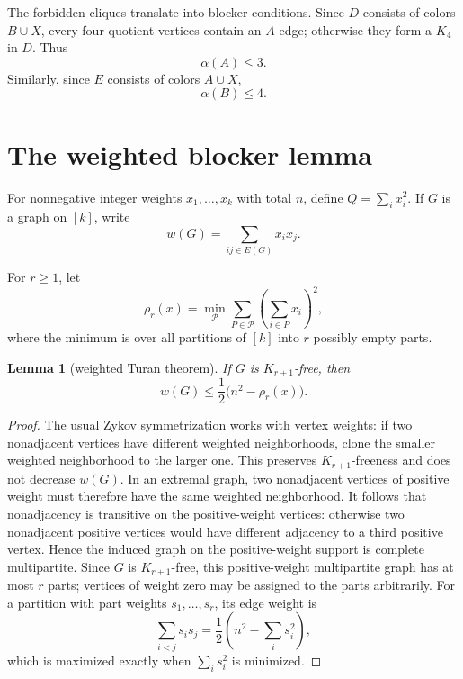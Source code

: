 \documentclass[12pt]{article}
\theoremstyle{plain}
\newtheorem{lemma}[theorem]{Lemma}
\theoremstyle{definition}
\theoremstyle{remark}
\begin{document}
The forbidden cliques translate into blocker conditions.  Since
\(D\) consists of colors \(B\cup X\), every four quotient vertices contain an
\(A\)-edge; otherwise they form a \(K_4\) in \(D\).  Thus
\begin{equation}\label{eq:alphaA}
  \alpha(A)\le3.
\end{equation}
Similarly, since \(E\) consists of colors \(A\cup X\),
\begin{equation}\label{eq:alphaB}
  \alpha(B)\le4.
\end{equation}

\section{The weighted blocker lemma}\label{sec:blocker}

For nonnegative integer weights \(x_1,\ldots,x_k\) with total \(n\), define
\(Q=\sum_i x_i^2\).  If \(G\) is a graph on \([k]\), write
\[
  w(G)=\sum_{ij\in E(G)}x_i x_j.
\]

For \(r\ge1\), let
\[
  \rho_r(x)=\min_{\mathcal P}\sum_{P\in\mathcal P}
  \left(\sum_{i\in P}x_i\right)^2,
\]
where the minimum is over all partitions of \([k]\) into \(r\) possibly empty
parts.

\begin{lemma}[weighted Turan theorem]\label{lem:weighted-turan}
If \(G\) is \(K_{r+1}\)-free, then
\begin{equation}\label{eq:weighted-turan}
  w(G)\le\frac12\bigl(n^2-\rho_r(x)\bigr).
\end{equation}
\end{lemma}

\begin{proof}
The usual Zykov symmetrization works with vertex weights: if two nonadjacent
vertices have different weighted neighborhoods, clone the smaller weighted
neighborhood to the larger one.  This preserves \(K_{r+1}\)-freeness and does
not decrease \(w(G)\).  In an extremal graph, two nonadjacent vertices of
positive weight must therefore have the same weighted neighborhood.  It follows
that nonadjacency is transitive on the positive-weight vertices: otherwise two
nonadjacent positive vertices would have different adjacency to a third
positive vertex.  Hence the induced graph on the positive-weight support is
complete multipartite.  Since \(G\) is \(K_{r+1}\)-free, this positive-weight
multipartite graph has at most \(r\) parts; vertices of weight zero may be
assigned to the parts arbitrarily.  For a partition with part weights
\(s_1,\ldots,s_r\), its edge weight is
\[
  \sum_{i<j}s_i s_j=\frac12\left(n^2-\sum_i s_i^2\right),
\]
which is maximized exactly when \(\sum_i s_i^2\) is minimized.
\end{proof}
\end{document}
